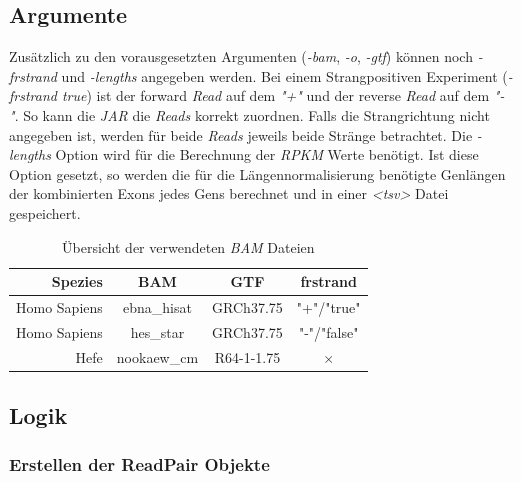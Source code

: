 \documentclass[12pt]{article}
\begin{document}
\subsection{Argumente}
Zusätzlich zu den vorausgesetzten Argumenten (\textit{-bam}, \textit{-o}, \textit{-gtf}) können noch \textit{-frstrand} und
\textit{-lengths} angegeben werden. 
Bei einem Strangpositiven Experiment (\textit{-frstrand true}) ist der forward \textit{Read} auf dem \textit{"+"} und der reverse \textit{Read} auf dem
\textit{"-"}. So kann die \textit{JAR} die \textit{Reads} korrekt zuordnen. 
Falls die Strangrichtung nicht angegeben ist, werden für beide \textit{Reads} jeweils beide Stränge betrachtet.
Die \textit{-lengths} Option wird für die Berechnung der \textit{RPKM} Werte benötigt. 
Ist diese Option gesetzt, so werden die für die Längennormalisierung benötigte Genlängen der kombinierten Exons jedes
Gens berechnet und in einer \textit{<tsv>} Datei gespeichert.
\begin{table}[htpb]
    \centering
    \caption{Übersicht der verwendeten \textit{BAM} Dateien}
    \label{tab:baminfo}
\begin{tabular}{r|c|c|c}
    \textbf{Spezies}   & \textbf{BAM} & \textbf{GTF} & \textbf{frstrand}\\ \hline
    Homo Sapiens & ebna\_hisat &GRCh37.75 & "+"/"true" \\
     Homo Sapiens & hes\_star & GRCh37.75 & "-"/"false"\\
     Hefe &  nookaew\_cm & R64-1-1.75 & $\times$ \\
\end{tabular}
\end{table}

\subsection{Logik}
\subsubsection{Erstellen der ReadPair Objekte}
\end{document}
